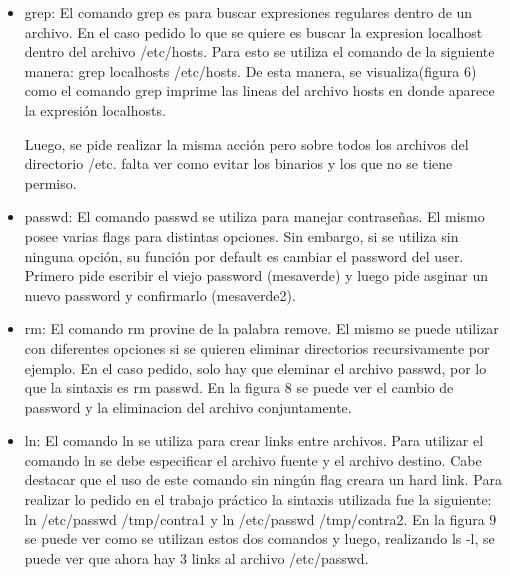 \documentclass[a4paper, 12pt]{article}
\begin{document}
\begin{itemize}
Cabe destacar que el comando chmod se utiliz\'o varias veces para ir cambiando de a poco los permisos seg\'un sean para el usuario, para el grupo o para los otros. Sin embargo, esto se puede realizar utilizando una sola vez el comando chmod. La sintaxis para el mismo ser\'ia chmod 751 passwd. El numero 751 esta es una manera de codificar los permisos, el 7(111) corresponde al user y esta poniendo en 1 los 3 permisos; el 5(101) es para el grupo, dado un orden predispuesto, lo que hace esto es setear en 1 los permisos de Read y eXecute, que son el primero y el tercero respectivamente, y setea en 0 el segundo permiso(Write). Por \'ultimo, el 1(001) corresponde a setear el permiso de eXecute para los Others.

\item grep: El comando grep es para buscar expresiones regulares dentro de un archivo. En el caso pedido lo que se quiere es buscar la expresion localhost dentro del archivo /etc/hosts. Para esto se utiliza el comando de la siguiente manera: grep localhosts /etc/hosts. De esta manera, se visualiza(figura 6) como el comando grep imprime las lineas del archivo hosts en donde aparece la expresi\'on localhosts.

Luego, se pide realizar la misma acci\'on pero sobre todos los archivos del directorio /etc.
falta ver como evitar los binarios y los que no se tiene permiso.

\item passwd: El comando passwd se utiliza para manejar contrase\~{n}as. El mismo posee varias flags para distintas opciones. Sin embargo, si se utiliza sin ninguna opci\'on, su funci\'on por default es cambiar el password del user. Primero pide escribir el viejo password (mesaverde) y luego pide asginar un nuevo password y confirmarlo (mesaverde2).

\item rm: El comando rm provine de la palabra remove. El mismo se puede utilizar con diferentes opciones si se quieren eliminar directorios recursivamente por ejemplo. En el caso pedido, solo hay que eleminar el archivo passwd, por lo que la sintaxis es rm passwd. En la figura 8 se puede ver el cambio de password y la eliminacion del archivo conjuntamente.

\item ln: El comando ln se utiliza para crear links entre archivos. Para utilizar el comando ln se debe especificar el archivo fuente y el archivo destino. Cabe destacar que el uso de este comando sin ning\'un flag creara un hard link. Para realizar lo pedido en el trabajo pr\'actico la sintaxis utilizada fue la siguiente: ln /etc/passwd /tmp/contra1 y ln /etc/passwd /tmp/contra2. En la figura 9 se puede ver como se utilizan estos dos comandos y luego, realizando ls -l, se puede ver que ahora hay 3 links al archivo /etc/passwd.


\end{itemize}
\end{document}
